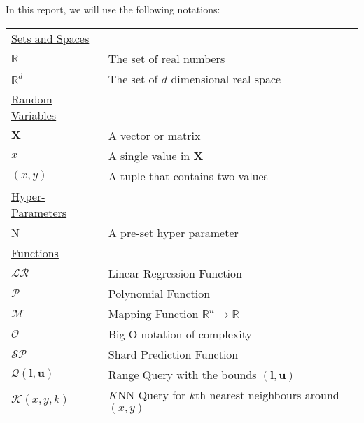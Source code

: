 In this report, we will use the following notations:

\begin{table}[h]
\begin{tabularx}{\textwidth}{@{}XX@{}}
\toprule
  \underline{Sets and Spaces} \\
  $\mathbb{R}$ & The set of real numbers \\
  $\mathbb{R}^d$ & The set of $d$ dimensional real space \\
  \underline{Random Variables} \\
  $\boldsymbol{X}$ & A vector or matrix \\
  $x$ & A single value in $\textbf{X}$ \\
  $(x,y)$ & A tuple that contains two values \\	
  \underline{Hyper-Parameters} \\
  N   & A pre-set hyper parameter \\
  \underline{Functions} \\
  $\mathcal{LR}$ & Linear Regression Function\\
  $\mathcal{P}$ & Polynomial Function\\
  $\mathcal{M}$ & Mapping Function $\mathbb{R}^n\to\mathbb{R}$\\
  $\mathcal{O}$ & Big-O notation of complexity\\
  $\mathcal{SP}$ & Shard Prediction Function\\
  $\mathcal{Q}(\boldsymbol{l},\boldsymbol{u})$ & Range Query with the bounds $(\boldsymbol{l}, \boldsymbol{u})$\\
  $\mathcal{K}(x,y,k)$ & $K$NN Query for $k$th nearest neighbours around $(x,y)$\\
\bottomrule
\end{tabularx}
\end{table}
